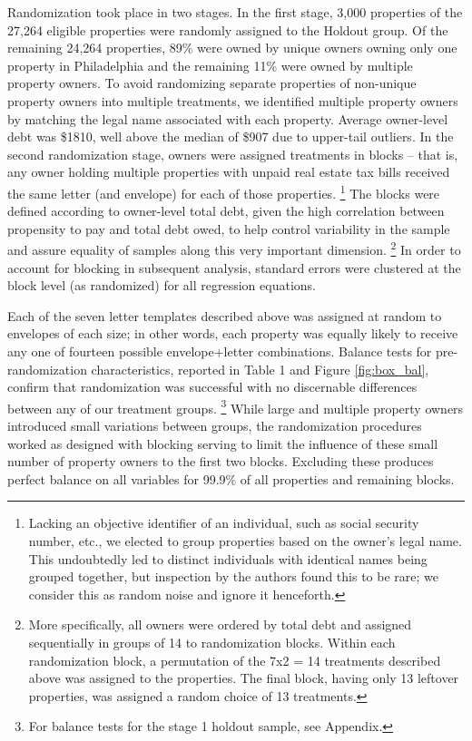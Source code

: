\documentclass[12pt,titlepage]{article}
\begin{document}
Randomization took place in two stages. In the first stage, 3,000 
properties of the 27,264 eligible properties were randomly assigned 
to the Holdout group. Of the remaining 24,264 properties, 89\% were 
owned by unique owners owning only one property in Philadelphia and 
the remaining 11\% were owned by multiple property owners. To avoid 
randomizing separate properties of non-unique property owners into 
multiple treatments, we identified multiple property owners by 
matching the legal name associated with each property. Average 
owner-level debt was \$1810, well above the median of \$907 due to 
upper-tail outliers. In the second randomization stage, owners were 
assigned treatments in blocks – that is, any owner holding multiple 
properties with unpaid real estate tax bills received the same letter 
(and envelope) for each of those properties.
\footnote{
	Lacking an objective identifier of an individual, such as social 
	security number, etc., we elected to group properties based on 
	the owner's legal name. This undoubtedly led to distinct 
	individuals with identical names being grouped together, but 
	inspection by the authors found this to be rare; we consider this 
	as random noise and ignore it henceforth.
}
The blocks were defined according to owner-level total debt, given 
the high correlation between propensity to pay and total debt owed, 
to help control variability in the sample and assure equality of 
samples along this very important dimension.
\footnote{
	More specifically, all owners were ordered by total debt and assigned 
	sequentially in groups of 14 to randomization blocks. Within each 
	randomization block, a permutation of the 7x2 = 14 treatments described 
	above was assigned to the properties. The final block, having only 13 
	leftover properties, was assigned a random choice of 13 treatments.
}
In order to account for blocking in subsequent analysis, standard errors 
were clustered at the block level (as randomized) for all regression equations. 

Each of the seven letter templates described above was assigned at random 
to envelopes of each size; in other words, each property was equally 
likely to receive any one of fourteen possible envelope+letter combinations. 
Balance tests for pre-randomization characteristics, 
reported in Table 1 and Figure \ref{fig:box_bal}, confirm that randomization was successful 
with no discernable differences between any of our treatment groups.
\footnote{For balance tests for the stage 1 holdout sample, see Appendix.}
While large and multiple property owners introduced small variations 
between groups, the randomization procedures worked as designed with 
blocking serving to limit the influence of these small number of property 
owners to the first two blocks. Excluding these produces perfect balance 
on all variables for 99.9\% of all properties and remaining blocks.
\end{document}
